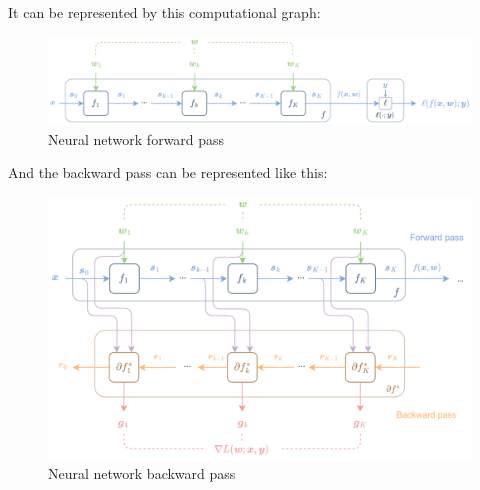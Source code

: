 \documentclass[12pt, openany]{report}
\theoremstyle{definition}
\begin{document}
It can be represented by this computational graph:\\
\begin{figure}[H]
    \centering
    \includegraphics[width=\textwidth]{img/nn_fd.png}
    \caption{Neural network forward pass}
    \label{fig:nn_fd}
\end{figure}
And the backward pass can be represented like this:\\
\begin{figure}[H]
    \centering
    \includegraphics[width=\textwidth]{img/nn_bd.png}
    \caption{Neural network backward pass}
    \label{fig:nn_bd}
\end{figure}
\end{document}

